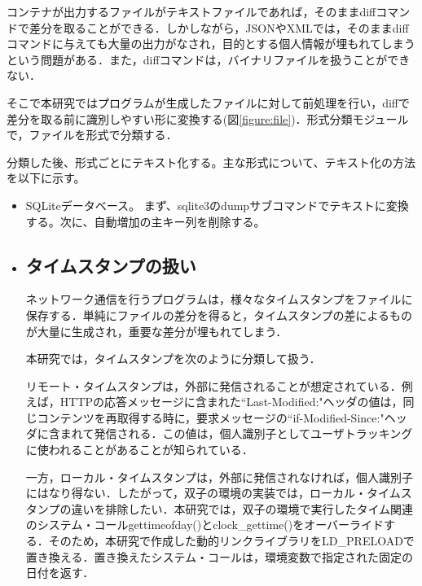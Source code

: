 \documentclass[submit,techrep]{ipsj}
\begin{document}
コンテナが出力するファイルがテキストファイルであれば，そのままdiffコマンドで差分を取ることができる．しかしながら，JSONやXMLでは，そのままdiffコマンドに与えても大量の出力がなされ，目的とする個人情報が埋もれてしまうという問題がある．また，diffコマンドは，バイナリファイルを扱うことができない．

そこで本研究ではプログラムが生成したファイルに対して前処理を行い，diffで差分を取る前に識別しやすい形に変換する(図\ref{figure:file})．形式分類モジュールで，ファイルを形式で分類する．

分類した後、形式ごとにテキスト化する。主な形式について、テキスト化の方法を以下に示す。
\begin{itemize}
\item
SQLiteデータベース。
まず、sqlite3のdumpサブコマンドでテキストに変換する。次に、自動増加の主キー列を削除する。
\item

\subsection{タイムスタンプの扱い}
\label{cha:timestamp}
ネットワーク通信を行うプログラムは，様々なタイムスタンプをファイルに保存する．単純にファイルの差分を得ると，タイムスタンプの差によるものが大量に生成され，重要な差分が埋もれてしまう．

本研究では，タイムスタンプを次のように分類して扱う．




リモート・タイムスタンプは，外部に発信されることが想定されている．例えば，HTTPの応答メッセージに含まれた``Last-Modified:"ヘッダの値は，同じコンテンツを再取得する時に，要求メッセージの``if-Modified-Since:"ヘッダに含まれて発信される．この値は，個人識別子としてユーザトラッキングに使われることがあることが知られている．

一方，ローカル・タイムスタンプは，外部に発信されなければ，個人識別子にはなり得ない．したがって，双子の環境の実装では，ローカル・タイムスタンプの違いを排除したい．本研究では，双子の環境で実行したタイム関連のシステム・コールgettimeofday()とclock\_gettime()をオーバーライドする．そのため，本研究で作成した動的リンクライブラリをLD\_PRELOADで置き換える．置き換えたシステム・コールは，環境変数で指定された固定の日付を返す．



\end{itemize}
\end{document}
